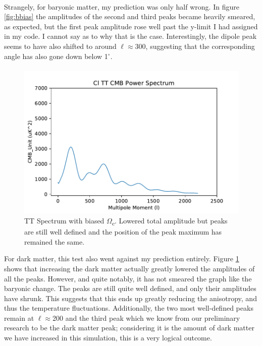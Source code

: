 \documentclass[twoside, fontsize=12pt,
     bibliography=totoc, %
     listof=totoc, %
     index=totoc, %
     onehalfspacing %
]{_MScDiss2017_cls}
\begin{document}
\paragraph{}

Strangely, for baryonic matter, my prediction was only half wrong. In figure \ref{fig:bbias} the amplitudes of the second and third peaks became heavily smeared, as expected, but the first peak amplitude rose well past the y-limit I had assigned in my code. I cannot say as to why that is the case. Interestingly, the dipole peak seems to have also shifted to around $\ell$$\approx$300, suggesting that the corresponding angle has also gone down below 1$^\circ$.

\paragraph{}

\begin{figure}
	\begin{center}
	\includegraphics{4Cl-TT-vs-l}
	\caption{TT Spectrum with biased $\Omega$\textsubscript{c}. Lowered total amplitude but peaks are still well defined and the position of the peak maximum has remained the same.}
	\label{fig:cbias}
	\end{center}
\end{figure}

For dark matter, this test also went against my prediction entirely. Figure \ref{fig:cbias} shows that increasing the dark matter actually greatly lowered the amplitudes of all the peaks. However, and quite notably, it has not smeared the graph like the baryonic change. The peaks are still quite well defined, and only their amplitudes have shrunk. This suggests that this ends up greatly reducing the anisotropy, and thus the temperature fluctuations. Additionally, the two most well-defined peaks remain at $\ell$$\approx$200 and the third peak which we know from our preliminary research to be the dark matter peak; considering it is the amount of dark matter we have increased in this simulation, this is a very logical outcome.
\end{document}
